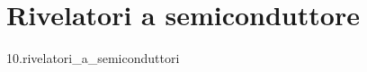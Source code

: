 \documentclass[12pt]{book}
\newcommand{\comment}[1]{}
\begin{document}
\chapter{Rivelatori a semiconduttore}
{10.rivelatori_a_semiconduttori}

\comment{%

\chapter{La tecnologia del vuoto}
{11.tecnologie_vuoto}

\chapter{Elettronica}\label{chap:elettronica}
{12.elettronica}

\chapter{Metodo Monte Carlo}
{13.montecarlo}

\chapter{Esperienze di laboratorio}
{14.esperienze}

\appendix

\chapter{Distribuzione di Poisson}
{A.distribuzione_Poisson}

\chapter{Multimetro digitale}
{B.multimetro}

}%
\end{document}
